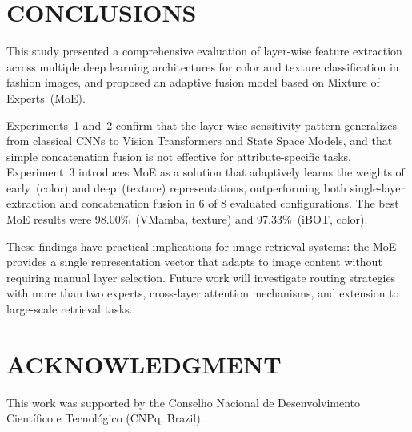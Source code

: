 \documentclass[letterpaper, 10 pt, conference]{ieeeconf}
\begin{document}
\section{CONCLUSIONS}

This study presented a comprehensive evaluation of layer-wise feature
extraction across multiple deep learning architectures for color and
texture classification in fashion images, and proposed an adaptive fusion
model based on Mixture of Experts~(MoE).

Experiments~1 and~2 confirm that the layer-wise sensitivity pattern
generalizes from classical CNNs to Vision Transformers and State Space
Models, and that simple concatenation fusion is not effective for
attribute-specific tasks.
Experiment~3 introduces MoE as a solution that adaptively learns the
weights of early~(color) and deep~(texture) representations, outperforming
both single-layer extraction and concatenation fusion in 6 of 8 evaluated
configurations.
The best MoE results were 98.00\%~(VMamba, texture) and
97.33\%~(iBOT, color).

These findings have practical implications for image retrieval systems:
the MoE provides a single representation vector that adapts to image
content without requiring manual layer selection.
Future work will investigate routing strategies with more than two experts,
cross-layer attention mechanisms, and extension to large-scale retrieval
tasks.

\section*{ACKNOWLEDGMENT}

This work was supported by the Conselho Nacional de Desenvolvimento
Cient\'{i}fico e Tecnol\'{o}gico (CNPq, Brazil).
\end{document}
